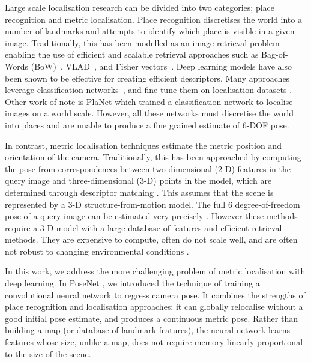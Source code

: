 Large scale localisation research can be divided into two categories; place recognition and metric localisation. Place recognition discretises the world into a number of landmarks and attempts to identify which place is visible in a given image. Traditionally, this has been modelled as an image retrieval problem \citep{chen2011city,cummins2008fab,Torii13CVPR,Schindler07CVPR} enabling the use of efficient and scalable retrieval approaches \citep{Nister06CVPR,Philbin07CVPR} such as Bag-of-Words (BoW)~\citep{Sivic03ICCV}, VLAD~\citep{Jegou-CVPR10,Delhumeau-ACMMM13}, and Fisher vectors~\citep{Jegou-PAMI12}. Deep learning models have also been shown to be effective for creating efficient descriptors. Many approaches leverage classification networks~\citep{RSMC14,GWGL14,BL15,Tolias16ICLR}, and fine tune them on localisation datasets \citep{BSCL14}. Other work of note is PlaNet \citep{weyand2016planet} which trained a classification network to localise images on a world scale. However, all these networks must discretise the world into places and are unable to produce a fine grained estimate of 6-DOF pose.

In contrast, metric localisation techniques estimate the metric position and orientation of the camera. Traditionally, this has been approached by computing the pose from correspondences between two-dimensional (2-D) features in the query image and three-dimensional (3-D) points in the model, which are determined through descriptor matching \citep{Choudhary12ECCV,li2010location,li2012worldwide,Sattler12ECCV,svarm2014accurate}. This assumes that the scene is represented by a 3-D structure-from-motion model. The full 6 degree-of-freedom pose of a query image can be estimated very precisely \citep{Sattler14ECCV}. However these methods require a 3-D model with a large database of features and efficient retrieval methods. They are expensive to compute, often do not scale well, and are often not robust to changing environmental conditions \citep{walch2016image}.

In this work, we address the more challenging problem of metric localisation with deep learning. In PoseNet \citep{kendall2015posenet}, we introduced the technique of training a convolutional neural network to regress camera pose. It combines the strengths of place recognition and localisation approaches: it can globally relocalise without a good initial pose estimate, and produces a continuous metric pose. Rather than building a map (or database of landmark features), the neural network learns features whose size, unlike a map, does not require memory linearly proportional to the size of the scene.

